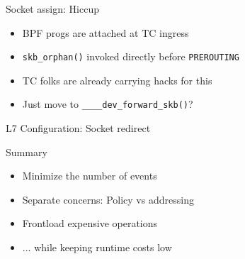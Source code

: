 \documentclass[black,white]{beamer}
\DeclareRobustCommand{\#}{\adjustbox{valign=B,totalheight=.57\baselineskip}{\oldhash}}%
\begin{document}
    \begin{frame}[fragile]{Socket assign: Hiccup}
        \centering
        \begin{itemize}
            \item BPF progs are attached at TC ingress \medskip
            \item \verb+skb_orphan()+ invoked directly before \verb+PREROUTING+ \medskip
            \pause
            \item TC folks are already carrying hacks for this\footnotemark \medskip
            \pause
            \item Just move to \verb+____dev_forward_skb()+\footnotemark? \medskip
        \end{itemize}
    \end{frame}

    \begin{frame}{L7 Configuration: Socket redirect}
        
    \end{frame}

    \begin{frame}{Summary}
        \begin{itemize}
            \item Minimize the number of events \medskip
            \item Separate concerns: Policy vs addressing \medskip
            \item Frontload expensive operations \medskip
            \item ... while keeping runtime costs low \medskip
        \end{itemize}
    \end{frame}
\end{document}
